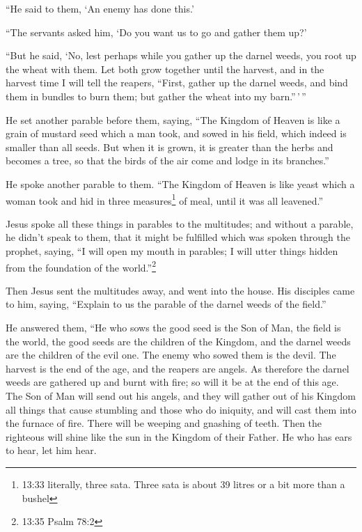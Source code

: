  ``He said to them, `An enemy has done this.'

``The servants asked him, `Do you want us to go and gather them up?'

 ``But he said, `No, lest perhaps while you gather up the
darnel weeds, you root up the wheat with them.  Let both
grow together until the harvest, and in the harvest time I will tell the
reapers, ``First, gather up the darnel weeds, and bind them in bundles
to burn them; but gather the wheat into my barn.''\,'\,''

 He set another parable before them, saying, ``The Kingdom
of Heaven is like a grain of mustard seed which a man took, and sowed in
his field,  which indeed is smaller than all seeds. But
when it is grown, it is greater than the herbs and becomes a tree, so
that the birds of the air come and lodge in its branches.''

 He spoke another parable to them. ``The Kingdom of Heaven
is like yeast which a woman took and hid in three measures\footnote{13:33
  literally, three sata. Three sata is about 39 litres or a bit more
  than a bushel} of meal, until it was all leavened.''

 Jesus spoke all these things in parables to the
multitudes; and without a parable, he didn't speak to them,
 that it might be fulfilled which was spoken through the
prophet, saying, ``I will open my mouth in parables; I will utter things
hidden from the foundation of the world.''\footnote{13:35 Psalm 78:2}

 Then Jesus sent the multitudes away, and went into the
house. His disciples came to him, saying, ``Explain to us the parable of
the darnel weeds of the field.''

 He answered them, ``He who sows the good seed is the Son
of Man,  the field is the world, the good seeds are the
children of the Kingdom, and the darnel weeds are the children of the
evil one.  The enemy who sowed them is the devil. The
harvest is the end of the age, and the reapers are angels. 
As therefore the darnel weeds are gathered up and burnt with fire; so
will it be at the end of this age.  The Son of Man will
send out his angels, and they will gather out of his Kingdom all things
that cause stumbling and those who do iniquity,  and will
cast them into the furnace of fire. There will be weeping and gnashing
of teeth.  Then the righteous will shine like the sun in
the Kingdom of their Father. He who has ears to hear, let him hear.

